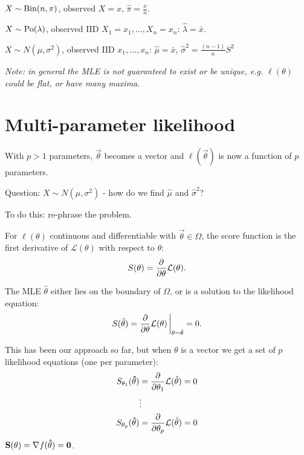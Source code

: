 \documentclass[10pt, a4paper]{article}
\begin{document}
\begin{proposition}
    $X \sim \operatorname{Bin}(n, \pi)$,
    observed $X = x$,
    $\hat{\pi} = \frac{x}{n}$.

    $X \sim \operatorname{Po}(\lambda)$,
    observed IID $X_1 = x_1, \dotsc, X_n = x_n$:
    $\hat{\lambda} = \bar{x}$.

    $X \sim N(\mu, \sigma ^ 2)$,
    observed IID $x_1, \dotsc, x_n$:
    $\hat{\mu} = \bar{x}$,
    $\hat{\sigma} ^ 2 = \frac{(n - 1)}{n}S ^ 2$
\end{proposition}

\textit{Note:
in general the MLE is not guaranteed to exist or be unique,
e.g. $\ell(\theta)$ could be flat,
or have many maxima.}

\newpage

\section{Multi-parameter likelihood}
With $p > 1$ parameters,
$\vec{\theta}$ becomes a vector and $\ell(\vec{\theta})$ is now a function of $p$ parameters.

Question:
$X \sim N(\mu, \sigma ^ 2)$ -
how do we find $\hat{\mu}$ and $\hat{\sigma} ^ 2$?

To do this:
re-phrase the problem.

\begin{definition}
    For $\ell(\theta)$ continuous and differentiable with $\vec{\theta} \in \Omega$,
    the score function is the first derivative of $\mathcal{L}(\theta)$ with respect to $\theta$:
    \[
    S(\theta) = \frac{\partial }{\partial \theta}\mathcal{L}(\theta).
    \]
\end{definition}

The MLE $\hat{\theta}$ either lies on the boundary of $\Omega$,
or is a solution to the likelihood equation:
\[
S(\hat{\theta}) = \frac{\partial }{\partial \theta}\mathcal{L}(\theta)\,\biggr|_{\theta = \hat{\theta}} = 0.
\]

This has been our approach so far,
but when $\theta$ is a vector we get a set of $p$ likelihood equations
(one per parameter):
\begin{align*}
    S_{\theta_1}(\mathbf{\hat{\theta}}) &= \frac{\partial }{\partial \theta_1}\mathcal{L}(\hat{\theta}) = 0 \\
    &\vdots \\
    S_{\theta_p}(\mathbf{\hat{\theta}}) &= \frac{\partial }{\partial \theta_p}\mathcal{L}(\hat{\theta}) = 0
\end{align*}
$\mathbf{S}(\mathbf{\theta}) = \nabla f(\mathbf{\hat{\theta}}) = \mathbf{0}$.
\end{document}
